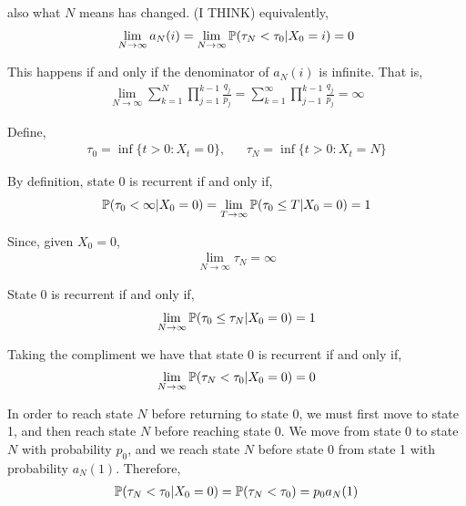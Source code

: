 \begin{solution}[Solution]
\begin{enumerate}[label=(\alph*)]
         also what \( N \) means has changed.
        (I THINK) equivalently,
        \begin{align*}
            \lim_{N\to\infty} a_N(i) = \lim_{N\to\infty} \mathbb{P}(\tau_N < \tau_0|X_0=i) = 0
        \end{align*}
        
        This happens if and only if the denominator of \( a_N(i) \) is infinite. That is,
        \begin{align*}
            \lim_{N \to\infty} \sum_{k=1}^{N} \prod_{j=1}^{k-1} \frac{q_j}{p_j} 
            = \sum_{k=1}^{\infty} \prod_{j-1}^{k-1} \frac{q_j}{p_j}
            = \infty
        \end{align*}
       
        \hrulefill
        \fi

        Define,
        \begin{align*}
            \tau_0 = \operatorname{inf}\{ t > 0 : X_t = 0 \},&&
            \tau_N = \operatorname{inf}\{ t > 0 : X_t = N \}
        \end{align*}
        
        By definition, state 0 is recurrent if and only if,
        \begin{align*}
            \mathbb{P}(\tau_0 < \infty | X_0 = 0 ) = \lim_{T\to\infty} \mathbb{P}(\tau_0 \leq T | X_0 = 0) = 1
        \end{align*}
        
        Since, given \( X_0 = 0 \),
        \begin{align*}
            \lim_{N\to\infty} \tau_N = \infty
        \end{align*}
        
        State 0 is recurrent if and only if,
        \begin{align*}
            \lim_{N\to\infty} \mathbb{P}(\tau_0 \leq \tau_N | X_0 = 0) = 1
        \end{align*}
        
        Taking the compliment we have that state 0 is recurrent if and only if,
        \begin{align*}
            \lim_{N\to\infty} \mathbb{P}(\tau_N < \tau_0 | X_0 = 0) = 0
        \end{align*}
        

        In order to reach state \( N \) before returning to state \( 0 \), we must first move to state 1, and then reach state \( N \) before reaching state \( 0 \). We move from state 0 to state \( N \) with probability \( p_0 \), and we reach state \( N \) before state \( 0 \) from state 1 with probability \( a_N(1) \). Therefore,
        \begin{align*}
            \mathbb{P}(\tau_N < \tau_0 | X_0=0) = \mathbb{P}(\tau_N < \tau_0) = p_0a_N(1)
        \end{align*}


\end{enumerate}
\end{solution}
